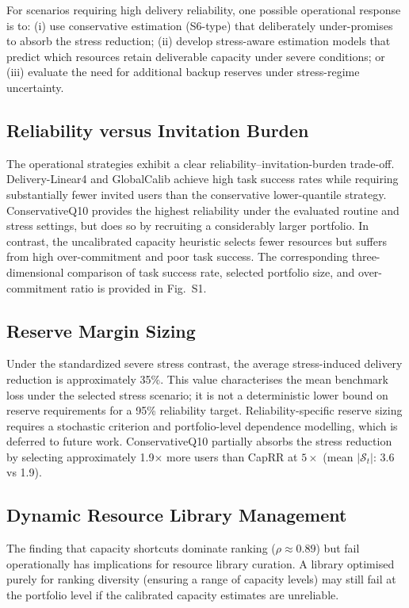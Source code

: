 \documentclass[utf8]{FrontiersinHarvard}
\begin{document}
For scenarios requiring high delivery reliability,
one possible operational response is to:
(i) use conservative estimation (S6-type) that deliberately
under-promises to absorb the stress reduction; (ii) develop
stress-aware estimation models that predict which resources
retain deliverable capacity under severe conditions; or
(iii) evaluate the need for additional backup reserves
under stress-regime uncertainty.

\subsection{Reliability versus Invitation Burden}

The operational strategies exhibit a clear reliability--invitation-burden
trade-off. Delivery-Linear4 and GlobalCalib achieve high task
success rates while requiring substantially fewer invited users
than the conservative lower-quantile strategy. ConservativeQ10
provides the highest reliability under the evaluated routine and
stress settings, but does so by recruiting a considerably larger
portfolio. In contrast, the uncalibrated capacity heuristic
selects fewer resources but suffers from high over-commitment
and poor task success. The corresponding three-dimensional
comparison of task success rate, selected portfolio size, and
over-commitment ratio is provided in Fig.~S1.

\subsection{Reserve Margin Sizing}

Under the standardized severe stress contrast, the average
stress-induced delivery reduction is approximately 35\%.
This value characterises the mean benchmark loss under the
selected stress scenario; it is not a deterministic lower
bound on reserve requirements for a 95\% reliability target.
Reliability-specific reserve sizing requires a stochastic
criterion and portfolio-level dependence modelling, which is
deferred to future work. ConservativeQ10 partially absorbs
the stress reduction by selecting approximately 1.9$\times$
more users than CapRR at $5\times$ (mean $|\mathcal{S}_t|$:
3.6 vs 1.9).

\subsection{Dynamic Resource Library Management}

The finding that capacity shortcuts dominate ranking
($\rho \approx 0.89$) but fail operationally has
implications for resource library curation. A library
optimised purely for ranking diversity (ensuring a range of
capacity levels) may still fail at the portfolio level if the
calibrated capacity estimates are unreliable.
\end{document}
